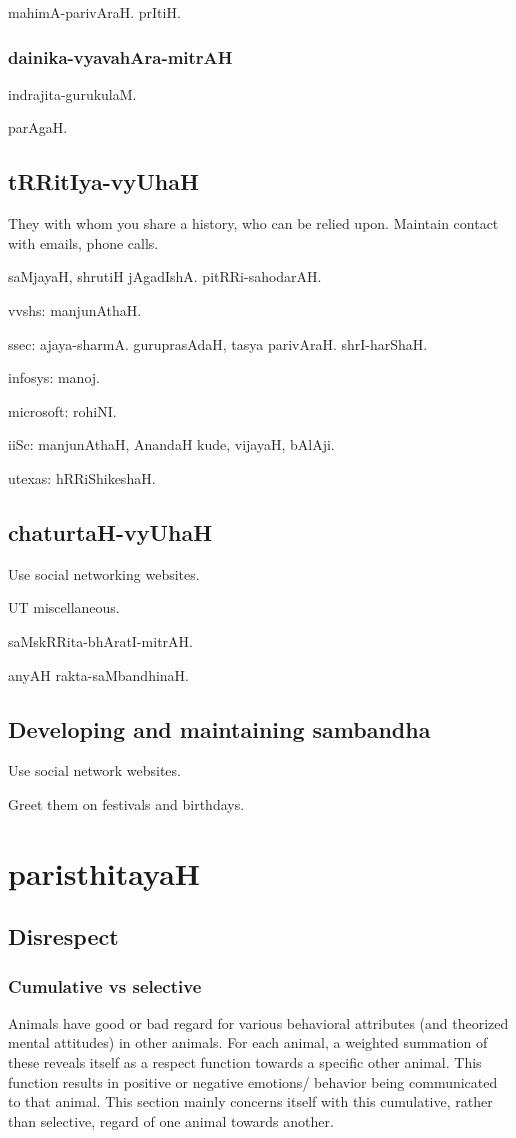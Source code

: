 \documentclass[oneside, article]{memoir}
\begin{document}
mahimA-parivAraH. prItiH.

\subsection{dainika-vyavahAra-mitrAH}
indrajita-gurukulaM.

parAgaH.

\section{tRRitIya-vyUhaH}
They with whom you share a history, who can be relied upon. Maintain contact with emails, phone calls.

saMjayaH, shrutiH jAgadIshA. pitRRi-sahodarAH.

vvshs: manjunAthaH.

ssec: ajaya-sharmA. guruprasAdaH, tasya parivAraH. shrI-harShaH.

infosys: manoj.

microsoft: rohiNI.

iiSc: manjunAthaH, AnandaH kude, vijayaH, bAlAji.

utexas: hRRiShikeshaH.

\section{chaturtaH-vyUhaH}
Use social networking websites.

UT miscellaneous.

saMskRRita-bhAratI-mitrAH. 

anyAH rakta-saMbandhinaH.

\section{Developing and maintaining sambandha}
Use social network websites.

Greet them on festivals and birthdays.



\chapter{paristhitayaH}
\section{Disrespect}
\subsection{Cumulative vs selective}
Animals have good or bad regard for various behavioral attributes (and theorized mental attitudes) in other animals. For each animal, a weighted summation of these reveals itself as a respect function towards a specific other animal. This function results in positive or negative emotions/ behavior being communicated to that animal. This section mainly concerns itself with this cumulative, rather than selective, regard of one animal towards another.
\end{document}
